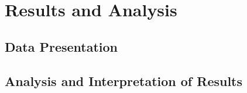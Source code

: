 \chapter{Results and Analysis}

\section{Data Presentation}
\lipsum[41] %

\section{Analysis and Interpretation of Results}
\lipsum[42] %